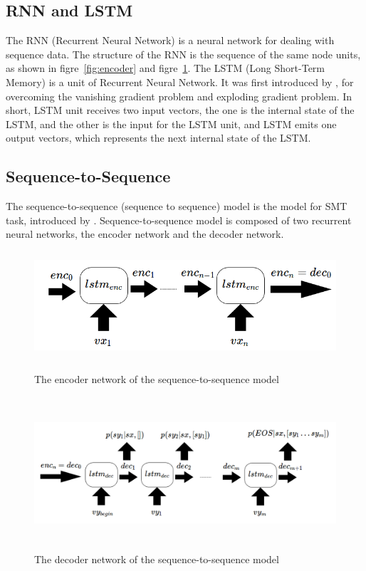 \documentclass[senior,final,11pt]{iscs-thesis}
\begin{document}
\subsection{RNN and LSTM}
The RNN (Recurrent Neural Network) is a neural network for dealing with sequence data.
The structure of the RNN is the sequence of the same node units, as shown in figre~\ref{fig:encoder} and figre~\ref{fig:decoder}. 
The LSTM (Long Short-Term Memory) is a unit of Recurrent Neural Network. 
It was first introduced by \citet{first_LSTM}, for overcoming the vanishing gradient problem and exploding gradient problem.
In short, LSTM unit receives two input vectors, 
the one is the internal state of the LSTM, and the other is the input for the LSTM unit, 
and LSTM emits one output vectors, which represents the next internal state of the LSTM.

\subsection{Sequence-to-Sequence}


The sequence-to-sequence (sequence to sequence) model is the model for SMT task, introduced by \citet{seq2seq}.
Sequence-to-sequence model is composed of two recurrent neural networks, the encoder network and the decoder network.

\begin{figure}[]
	\begin{center}
	\includegraphics[height=4cm]{encoder.png}
	\end{center}
	\caption{The encoder network of the sequence-to-sequence model}
	\label{fig:encoder}
	\begin{center}
	\includegraphics[height=5.7cm]{decoder.png}
	\end{center}
	\caption{ The decoder network of the sequence-to-sequence model}
	\label{fig:decoder}
\end{figure}
\end{document}
